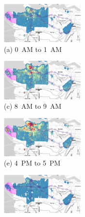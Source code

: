 \begin{figure}[hhh!!]
\centering
   \begin{minipage}[b]{0.3\linewidth}
   \centering      
         \begin{minipage}[b]{\linewidth}
           \hspace*{-0.9cm}
           \centering
           \includegraphics[width=42mm]{evo_heatmaps/min/hora0.pdf}
           {\\(a) 0~AM to 1~AM}
         \end{minipage}
         \begin{minipage}[b]{\linewidth}
           \centering
           \hspace*{-0.9cm}
           \includegraphics[width=42mm]{evo_heatmaps/min/hora8.pdf}
           {\\(c) 8~AM to 9~AM}
         \end{minipage}
         \begin{minipage}[b]{\linewidth}
           \centering
           \hspace*{-0.9cm}
           \includegraphics[width=42mm]{evo_heatmaps/min/hora16.pdf}
           {\\(e) 4~PM to 5~PM}
         \end{minipage}
   \end{minipage}
   \hspace{3mm}
   \begin{minipage}[b]{0.3\linewidth}
   \centering
         \begin{minipage}[b]{\linewidth}
           \centering
           \hspace*{-0.1cm}
           \includegraphics[width=42mm]{evo_heatmaps/min/hora4.pdf}

\end{minipage}
\end{minipage}
\end{figure}
